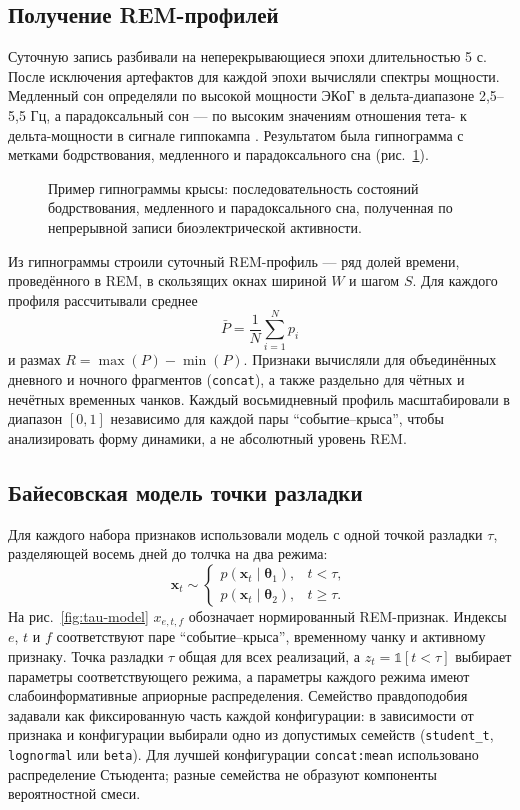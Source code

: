 \documentclass[14pt]{mmcs_article}
\begin{document}
\subsection{Получение REM-профилей}

Суточную запись разбивали на неперекрывающиеся эпохи длительностью 5 с.
После исключения артефактов для каждой эпохи вычисляли спектры мощности.
Медленный сон определяли по высокой мощности ЭКоГ в
дельта-диапазоне 2,5--5,5 Гц, а парадоксальный сон --- по высоким
значениям отношения тета- к дельта-мощности в сигнале гиппокампа
\cite{Fang2010,Vyazovskiy2005,Saevskiy2025}. Результатом была
гипнограмма с метками бодрствования, медленного и парадоксального сна
(рис.~\ref{fig:hypnogram}).

\begin{figure}[H]
  \centering
  
  \caption{Пример гипнограммы крысы: последовательность состояний
  бодрствования, медленного и парадоксального сна, полученная по
  непрерывной записи биоэлектрической активности.}
  \label{fig:hypnogram}
\end{figure}

Из гипнограммы строили суточный REM-профиль --- ряд долей времени,
проведённого в REM, в скользящих окнах шириной $W$ и шагом $S$. Для
каждого профиля рассчитывали среднее
\[
 \bar P=\frac{1}{N}\sum_{i=1}^{N}p_i
\]
и размах $R=\max(P)-\min(P)$. Признаки вычисляли для объединённых
дневного и ночного фрагментов (\texttt{concat}), а также раздельно для
чётных и нечётных временных чанков. Каждый восьмидневный профиль
масштабировали в диапазон $[0,1]$ независимо для каждой пары
``событие--крыса'', чтобы анализировать форму динамики, а не абсолютный
уровень REM.

\subsection{Байесовская модель точки разладки}

Для каждого набора признаков использовали модель с одной точкой
разладки $\tau$, разделяющей восемь дней до толчка на два режима:
\[
 \mathbf{x}_t\sim
 \begin{cases}
 p(\mathbf{x}_t\mid\boldsymbol{\theta}_1),&t<\tau,\\
 p(\mathbf{x}_t\mid\boldsymbol{\theta}_2),&t\geq\tau.
 \end{cases}
\]
На рис.~\ref{fig:tau-model} $x_{e,t,f}$ обозначает нормированный
REM-признак. Индексы $e$, $t$ и $f$ соответствуют паре
``событие--крыса'', временному чанку и активному признаку. Точка
разладки $\tau$ общая для всех реализаций, а
$z_t=\mathbb{1}[t<\tau]$ выбирает параметры соответствующего режима,
а параметры каждого режима имеют слабоинформативные априорные
распределения. Семейство правдоподобия задавали как фиксированную часть
каждой конфигурации: в зависимости от признака и конфигурации выбирали
одно из допустимых семейств (\texttt{student\_t}, \texttt{lognormal}
или \texttt{beta}). Для лучшей конфигурации \texttt{concat:mean}
использовано распределение Стьюдента; разные семейства не образуют
компоненты вероятностной смеси.
\end{document}
